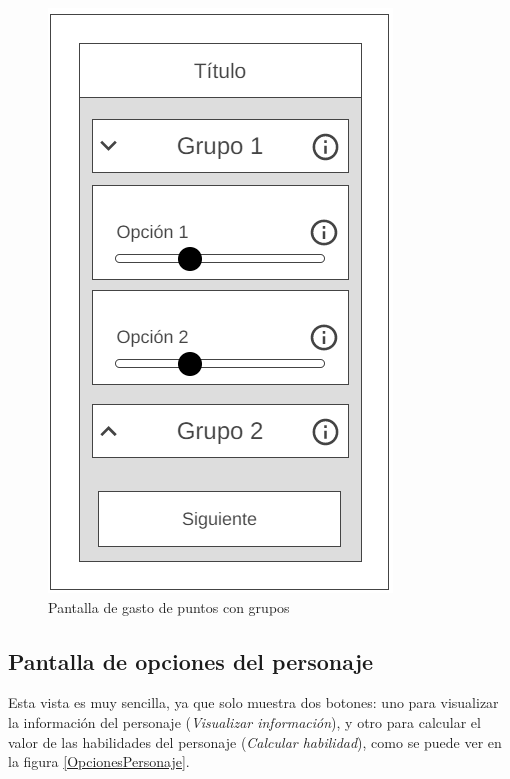 \begin{figure}[H]
    \centering
    \includegraphics[scale=0.3]{Figures/Mockups/Mock_GastoPuntosGrupo.png}
    \caption{Pantalla de gasto de puntos con grupos}
    \label{GastoPuntosGrupos}    
\end{figure}

\subsection{Pantalla de opciones del personaje}
Esta vista es muy sencilla, ya que solo muestra dos botones: uno para visualizar la información del personaje 
(\textit{Visualizar información}), y otro para calcular el valor de las habilidades del personaje (\textit{Calcular habilidad}), 
como se puede ver en la figura \ref*{OpcionesPersonaje}.

